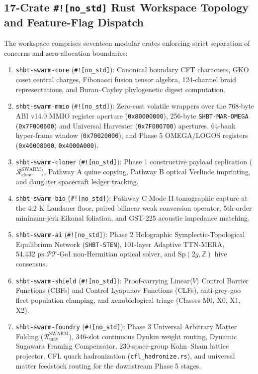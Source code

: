 \documentclass[11pt,onecolumn]{article}
\begin{document}
\subsection{17-Crate \texttt{\#![no\_std]} Rust Workspace Topology and Feature-Flag Dispatch}
The workspace comprises seventeen modular crates enforcing strict separation of concerns and zero-allocation boundaries:
\begin{enumerate}
    \item \texttt{shbt-swarm-core} (\texttt{\#![no\_std]}): Canonical boundary CFT characters, GKO coset central charges, Fibonacci fusion tensor algebra, 124-channel braid representations, and Burau--Cayley phylogenetic digest computation.
    \item \texttt{shbt-swarm-mmio} (\texttt{\#![no\_std]}): Zero-cost volatile wrappers over the 768-byte ABI v14.0 MMIO register aperture (\texttt{0x80000000}), 256-byte \texttt{SHBT-MAR-OMEGA} (\texttt{0x7F000600}) and Universal Harvester (\texttt{0x7F000700}) apertures, 64-bank hyper-frame window (\texttt{0x70020000}), and Phase 5 OMEGA/LOGOS registers (\texttt{0x40008000}, \texttt{0x4000A000}).
    \item \texttt{shbt-swarm-cloner} (\texttt{\#![no\_std]}): Phase 1 constructive payload replication ($\mathcal{R}_{\text{clone}}^{\text{SWARM}}$), Pathway A quine copying, Pathway B optical Verlinde imprinting, and daughter spacecraft ledger tracking.
    \item \texttt{shbt-swarm-bio} (\texttt{\#![no\_std]}): Pathway C Mode II tomographic capture at the $4.2\text{ K}$ Landauer floor, paired bilinear weak conversion operator, 5th-order minimum-jerk Eikonal foliation, and GST-225 acoustic impedance matching.
    \item \texttt{shbt-swarm-ai} (\texttt{\#![no\_std]}): Phase 2 Holographic Symplectic-Topological Equilibrium Network (\texttt{SHBT-STEN}), 101-layer Adaptive TTN-MERA, $54.432\text{ ps}$ $\mathcal{PT}$-GoI non-Hermitian optical solver, and $\text{Sp}(2g, \mathbb{Z})$ hive consensus.
    \item \texttt{shbt-swarm-shield} (\texttt{\#![no\_std]}): Proof-carrying $\text{Linear}\langle V\rangle$ Control Barrier Functions (CBFs) and Control Lyapunov Functions (CLFs), anti-grey-goo fleet population clamping, and xenobiological triage (Classes M0, X0, X1, X2).
    \item \texttt{shbt-swarm-foundry} (\texttt{\#![no\_std]}): Phase 3 Universal Arbitrary Matter Folding ($\mathcal{R}_{\text{univ}}^{\text{SWARM}}$), 346-slot continuous Dynkin weight routing, Dynamic Sugawara Framing Compensator, 230-space-group Kohn--Sham lattice projector, CFL quark hadronization (\texttt{cfl\_hadronize.rs}), and universal matter feedstock routing for the downstream Phase 5 stages.

\end{enumerate}
\end{document}
